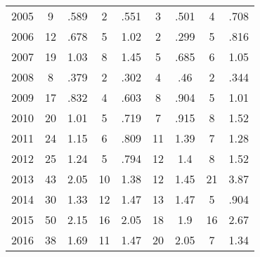 \begin{table}[htbp]
\begin{tabular}{l*{8}{c}}
2005      &        9&     .589&        2&     .551&        3&     .501&        4&     .708\\
2006      &       12&     .678&        5&     1.02&        2&     .299&        5&     .816\\
2007      &       19&     1.03&        8&     1.45&        5&     .685&        6&     1.05\\
2008      &        8&     .379&        2&     .302&        4&      .46&        2&     .344\\
2009      &       17&     .832&        4&     .603&        8&     .904&        5&     1.01\\
2010      &       20&     1.01&        5&     .719&        7&     .915&        8&     1.52\\
2011      &       24&     1.15&        6&     .809&       11&     1.39&        7&     1.28\\
2012      &       25&     1.24&        5&     .794&       12&      1.4&        8&     1.52\\
2013      &       43&     2.05&       10&     1.38&       12&     1.45&       21&     3.87\\
2014      &       30&     1.33&       12&     1.47&       13&     1.47&        5&     .904\\
2015      &       50&     2.15&       16&     2.05&       18&      1.9&       16&     2.67\\
2016      &       38&     1.69&       11&     1.47&       20&     2.05&        7&     1.34\\
\hline\hline
\end{tabular}
\end{table}
